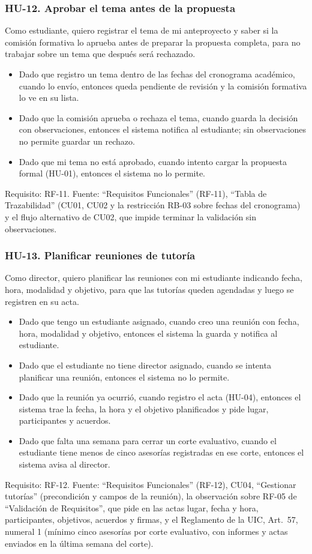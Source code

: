 \subsubsection*{HU-12. Aprobar el tema antes de la propuesta}
Como estudiante, quiero registrar el tema de mi anteproyecto y saber si la comisión formativa lo aprueba antes de preparar la propuesta completa, para no trabajar sobre un tema que después será rechazado.
\begin{itemize}
  \item Dado que registro un tema dentro de las fechas del cronograma académico, cuando lo envío, entonces queda pendiente de revisión y la comisión formativa lo ve en su lista.
  \item Dado que la comisión aprueba o rechaza el tema, cuando guarda la decisión con observaciones, entonces el sistema notifica al estudiante; sin observaciones no permite guardar un rechazo.
  \item Dado que mi tema no está aprobado, cuando intento cargar la propuesta formal (HU-01), entonces el sistema no lo permite.
\end{itemize}
Requisito: RF-11. Fuente: \enquote{Requisitos Funcionales} (RF-11), \enquote{Tabla de Trazabilidad} (CU01, CU02 y la restricción RB-03 sobre fechas del cronograma) y el flujo alternativo de CU02, que impide terminar la validación sin observaciones.

\subsubsection*{HU-13. Planificar reuniones de tutoría}
Como director, quiero planificar las reuniones con mi estudiante indicando fecha, hora, modalidad y objetivo, para que las tutorías queden agendadas y luego se registren en su acta.
\begin{itemize}
  \item Dado que tengo un estudiante asignado, cuando creo una reunión con fecha, hora, modalidad y objetivo, entonces el sistema la guarda y notifica al estudiante.
  \item Dado que el estudiante no tiene director asignado, cuando se intenta planificar una reunión, entonces el sistema no lo permite.
  \item Dado que la reunión ya ocurrió, cuando registro el acta (HU-04), entonces el sistema trae la fecha, la hora y el objetivo planificados y pide lugar, participantes y acuerdos.
  \item Dado que falta una semana para cerrar un corte evaluativo, cuando el estudiante tiene menos de cinco asesorías registradas en ese corte, entonces el sistema avisa al director.
\end{itemize}
Requisito: RF-12. Fuente: \enquote{Requisitos Funcionales} (RF-12), CU04, \enquote{Gestionar tutorías} (precondición y campos de la reunión), la observación sobre RF-05 de \enquote{Validación de Requisitos}, que pide en las actas lugar, fecha y hora, participantes, objetivos, acuerdos y firmas, y el Reglamento de la UIC, Art.~57, numeral 1 (mínimo cinco asesorías por corte evaluativo, con informes y actas enviados en la última semana del corte).
